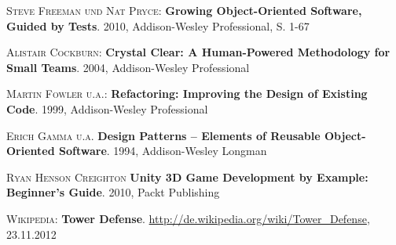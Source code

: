 \begin{thebibliography}{---}

  \textsc{Steve Freeman und Nat Pryce}: 
  \textbf{Growing Object-Oriented Software, Guided by Tests}.
  2010, Addison-Wesley Professional, S. 1-67
  
    \textsc{Alistair Cockburn}: 
    \textbf{Crystal Clear: A Human-Powered Methodology for Small Teams}.
    2004, Addison-Wesley Professional
  
    \textsc{Martin Fowler u.a.}: 
    \textbf{Refactoring: Improving the Design of Existing Code}.
    1999, Addison-Wesley Professional
  
  \textsc{Erich Gamma u.a.}
  \textbf{Design Patterns – Elements of Reusable Object-Oriented Software}.
  1994, Addison-Wesley Longman
  
  \textsc{Ryan Henson Creighton}
  \textbf{Unity 3D Game Development by Example: Beginner's Guide}.
  2010, Packt Publishing
  
  \textsc{Wikipedia}: 
  \textbf{Tower Defense}.
    \url{http://de.wikipedia.org/wiki/Tower\_Defense}, 23.11.2012

\end{thebibliography}

